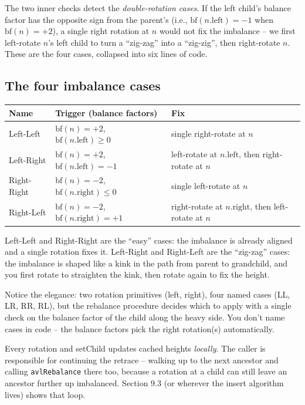 \documentclass[11pt]{article}
\begin{document}
The two inner checks detect the \emph{double-rotation cases}. If the left child's balance factor has the opposite sign from the parent's (i.e., $\text{bf}(n.\text{left}) = -1$ when $\text{bf}(n) = +2$), a single right rotation at $n$ would not fix the imbalance -- we first left-rotate $n$'s left child to turn a ``zig-zag'' into a ``zig-zig'', then right-rotate $n$. These are the four cases, collapsed into six lines of code.

\subsection*{The four imbalance cases}

\begin{center}
\begin{tabular}{lll}
Name  & Trigger (balance factors)    & Fix \\
\hline
Left-Left   & $\text{bf}(n) = +2$, $\text{bf}(n.\text{left}) \ge 0$   & single right-rotate at $n$ \\
Left-Right  & $\text{bf}(n) = +2$, $\text{bf}(n.\text{left}) = -1$    & left-rotate at $n.\text{left}$, then right-rotate at $n$ \\
Right-Right & $\text{bf}(n) = -2$, $\text{bf}(n.\text{right}) \le 0$  & single left-rotate at $n$ \\
Right-Left  & $\text{bf}(n) = -2$, $\text{bf}(n.\text{right}) = +1$   & right-rotate at $n.\text{right}$, then left-rotate at $n$ \\
\end{tabular}
\end{center}

Left-Left and Right-Right are the ``easy'' cases: the imbalance is already aligned and a single rotation fixes it. Left-Right and Right-Left are the ``zig-zag'' cases: the imbalance is shaped like a kink in the path from parent to grandchild, and you first rotate to straighten the kink, then rotate again to fix the height.

\begin{ideabox}
Notice the elegance: two rotation primitives (left, right), four named cases (LL, LR, RR, RL), but the rebalance procedure decides which to apply with a single check on the balance factor of the child along the heavy side. You don't name cases in code -- the balance factors pick the right rotation(s) automatically.
\end{ideabox}

\begin{warnbox}
Every rotation and setChild updates cached heights \emph{locally}. The caller is responsible for continuing the retrace -- walking up to the next ancestor and calling \texttt{avlRebalance} there too, because a rotation at a child can still leave an ancestor further up imbalanced. Section 9.3 (or wherever the insert algorithm lives) shows that loop.
\end{warnbox}
\end{document}
